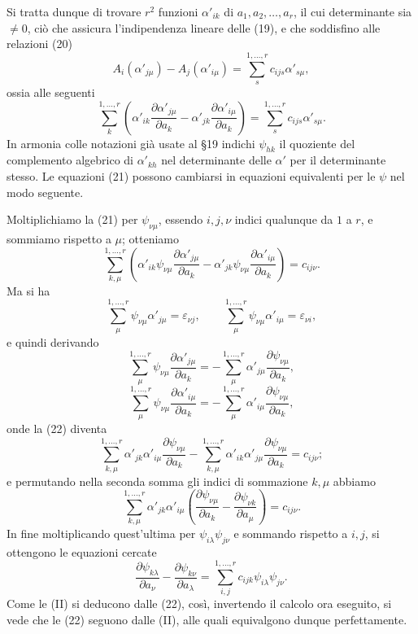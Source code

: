 \documentclass[11pt]{book}
\begin{document}
Si tratta dunque di trovare $r^2$ funzioni $\alpha'_{ik}$ di $a_1,a_2,\ldots,a_r$, il cui determinante sia $\ne0$, ciò che assicura l'indipendenza lineare delle (19), e che soddisfino alle relazioni (20)
\[
 A_i(\alpha'_{j\mu})-A_j(\alpha'_{i\mu})=\sum\limits_s^{1,\ldots,r} c_{ijs}\alpha'_{s\mu},
\]
ossia alle seguenti
\begin{equation*}\tag{21}
 \sum\limits_k^{1,\ldots,r}
 \left(\alpha'_{ik}\frac{\partial\alpha'_{j\mu}}{\partial a_k}
      -\alpha'_{jk}\frac{\partial\alpha'_{i\mu}}{\partial a_k}\right)
 =\sum\limits_s^{1,\ldots,r} c_{ijs}\alpha'_{s\mu}.
\end{equation*}
In armonia colle notazioni già usate al \S{}19 indichi $\psi_{hk}$ il quoziente del complemento algebrico di $\alpha'_{kh}$ nel determinante delle $\alpha'$ per il determinante stesso. Le equazioni (21) possono cambiarsi in equazioni equivalenti per le $\psi$ nel modo seguente.

Moltiplichiamo la (21) per $\psi_{\nu\mu}$, essendo $i,j,\nu$ indici qualunque da $1$ a $r$, e sommiamo rispetto a $\mu$; otteniamo
\begin{equation*}\tag{22}
 \sum\limits_{k,\mu}^{1,\ldots,r}
 \left(\alpha'_{ik}\psi_{\nu\mu}\frac{\partial\alpha'_{j\mu}}{\partial a_k}
      -\alpha'_{jk}\psi_{\nu\mu}\frac{\partial\alpha'_{i\mu}}{\partial a_k}\right)
 =c_{ij\nu}.
\end{equation*}
Ma si ha
\[
 \sum\limits_\mu^{1,\ldots,r}\psi_{\nu\mu}\alpha'_{j\mu}=\varepsilon_{\nu j},
 \qquad
 \sum\limits_\mu^{1,\ldots,r}\psi_{\nu\mu}\alpha'_{i\mu}=\varepsilon_{\nu i},
\]
e quindi derivando
\[
 \sum\limits_\mu^{1,\ldots,r}\psi_{\nu\mu}\frac{\partial\alpha'_{j\mu}}{\partial a_k}
 =-\sum\limits_\mu^{1,\ldots,r}\alpha'_{j\mu}\frac{\partial\psi_{\nu\mu}}{\partial a_k},
\]
\[
 \sum\limits_\mu^{1,\ldots,r}\psi_{\nu\mu}\frac{\partial\alpha'_{i\mu}}{\partial a_k}
 =-\sum\limits_\mu^{1,\ldots,r}\alpha'_{i\mu}\frac{\partial\psi_{\nu\mu}}{\partial a_k},
\]
onde la (22) diventa
\[
 \sum\limits_{k,\mu}^{1,\ldots,r}\alpha'_{jk}\alpha'_{i\mu}\frac{\partial\psi_{\nu\mu}}{\partial a_k}
 -\sum\limits_{k,\mu}^{1,\ldots,r}\alpha'_{ik}\alpha'_{j\mu}\frac{\partial\psi_{\nu\mu}}{\partial a_k}=c_{ij\nu};
\]
e permutando nella seconda somma gli indici di sommazione $k,\mu$ abbiamo
\[
 \sum\limits_{k,\mu}^{1,\ldots,r}\alpha'_{jk}\alpha'_{i\mu}
 \left(\frac{\partial\psi_{\nu\mu}}{\partial a_k}
      -\frac{\partial\psi_{\nu k}}{\partial a_\mu}\right)=c_{ij\nu}.
\]
In fine moltiplicando quest'ultima per $\psi_{i\lambda}\psi_{j\nu}$ e sommando rispetto a $i,j$, si ottengono le equazioni cercate
\begin{equation*}\tag{II}
 \frac{\partial\psi_{k\lambda}}{\partial a_\nu}
 -\frac{\partial\psi_{k\nu}}{\partial a_\lambda}
 =\sum\limits_{i,j}^{1,\ldots,r}c_{ijk}\psi_{i\lambda}\psi_{j\nu}.
\end{equation*}
Come le (II) si deducono dalle (22), così, invertendo il calcolo ora eseguito, si vede che le (22) seguono dalle (II), alle quali equivalgono dunque perfettamente.
\end{document}
